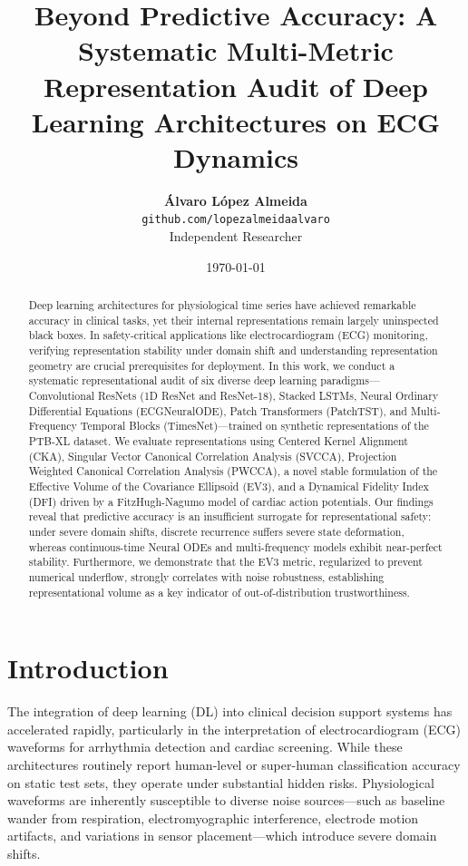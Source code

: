 \documentclass[twocolumn]{article}
\title{\textbf{Beyond Predictive Accuracy: A Systematic Multi-Metric Representation Audit of Deep Learning Architectures on ECG Dynamics}}
\author{
  \textbf{Álvaro López Almeida} \\
  \small \texttt{github.com/lopezalmeidaalvaro} \\
  \small Independent Researcher
}
\date{\today}
\begin{document}
\maketitle

\begin{abstract}
Deep learning architectures for physiological time series have achieved remarkable accuracy in clinical tasks, yet their internal representations remain largely uninspected black boxes. In safety-critical applications like electrocardiogram (ECG) monitoring, verifying representation stability under domain shift and understanding representation geometry are crucial prerequisites for deployment. In this work, we conduct a systematic representational audit of six diverse deep learning paradigms—Convolutional ResNets (1D ResNet and ResNet-18), Stacked LSTMs, Neural Ordinary Differential Equations (ECGNeuralODE), Patch Transformers (PatchTST), and Multi-Frequency Temporal Blocks (TimesNet)—trained on synthetic representations of the PTB-XL dataset. We evaluate representations using Centered Kernel Alignment (CKA), Singular Vector Canonical Correlation Analysis (SVCCA), Projection Weighted Canonical Correlation Analysis (PWCCA), a novel stable formulation of the Effective Volume of the Covariance Ellipsoid (EV3), and a Dynamical Fidelity Index (DFI) driven by a FitzHugh-Nagumo model of cardiac action potentials. Our findings reveal that predictive accuracy is an insufficient surrogate for representational safety: under severe domain shifts, discrete recurrence suffers severe state deformation, whereas continuous-time Neural ODEs and multi-frequency models exhibit near-perfect stability. Furthermore, we demonstrate that the EV3 metric, regularized to prevent numerical underflow, strongly correlates with noise robustness, establishing representational volume as a key indicator of out-of-distribution trustworthiness.
\end{abstract}

\section{Introduction}
\label{sec:intro}
The integration of deep learning (DL) into clinical decision support systems has accelerated rapidly, particularly in the interpretation of electrocardiogram (ECG) waveforms for arrhythmia detection and cardiac screening. While these architectures routinely report human-level or super-human classification accuracy on static test sets, they operate under substantial hidden risks. Physiological waveforms are inherently susceptible to diverse noise sources—such as baseline wander from respiration, electromyographic interference, electrode motion artifacts, and variations in sensor placement—which introduce severe domain shifts.
\end{document}
